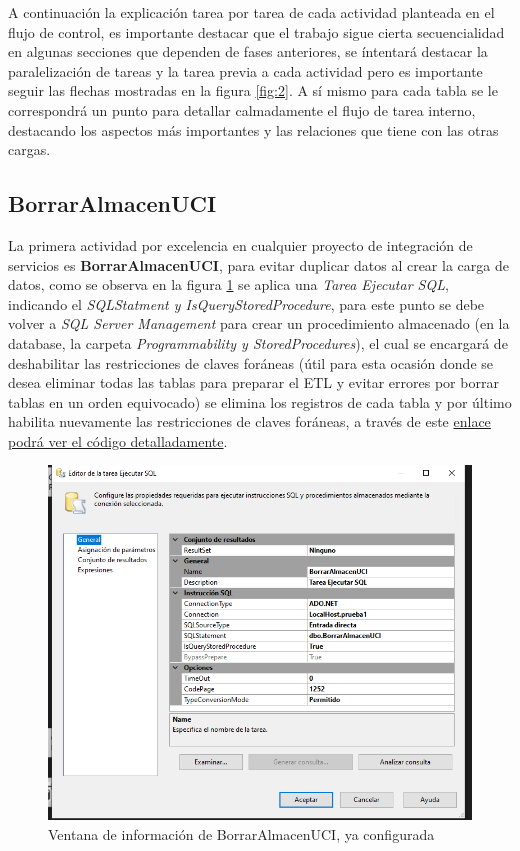 \documentclass[12pt, a4paper, twoside]{article}
\begin{document}
	A continuación la explicación tarea por tarea de cada actividad planteada en el flujo de control, es importante destacar que el trabajo sigue cierta secuencialidad en algunas secciones que dependen de fases anteriores, se íntentará destacar la paralelización de tareas y la tarea previa a cada actividad pero es importante seguir las flechas mostradas en la figura \ref{fig:2}. A sí mismo para cada tabla se le correspondrá un punto para detallar calmadamente el flujo de tarea interno, destacando los aspectos más importantes y las relaciones que tiene con las otras cargas. 
	
	\subsection{BorrarAlmacenUCI}	
		
	La primera actividad por excelencia en cualquier proyecto de integración de servicios es \textbf{BorrarAlmacenUCI}, para evitar duplicar datos al crear la carga de datos, como se observa en la figura \ref{fig:3} se aplica una \textit{Tarea Ejecutar SQL}, indicando el \textit{SQLStatment y IsQueryStoredProcedure}, para este punto se debe volver a \textit{SQL Server Management} para crear un procedimiento almacenado (en la database, la carpeta \textit{Programmability y StoredProcedures}), el cual se encargará de deshabilitar las restricciones de claves foráneas (útil para esta ocasión donde se desea eliminar todas las tablas para preparar el ETL y evitar errores por borrar tablas en un orden equivocado) se elimina los registros de cada tabla y por último habilita nuevamente las restricciones de claves foráneas, a través de este \href{https://github.com/Diegodepab/almacen_UCI_Sanitaria/blob/main/ETL/BorrarAlmacenUCI.sql}{enlace podrá ver el código detalladamente}.

	\begin{figure}[H]
		\centering
		\includegraphics[width=1\textwidth]{image/101_BorrarAlmacenUCI.png}
		\caption{Ventana de información de BorrarAlmacenUCI, ya configurada}
		\label{fig:3}
	\end{figure}
	
\end{document}

